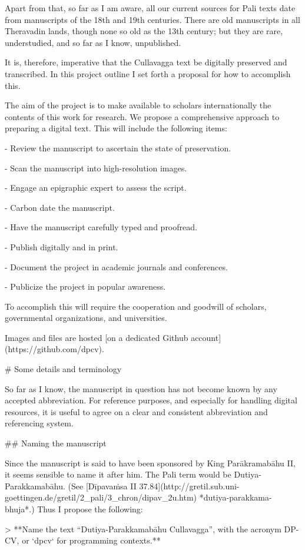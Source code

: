 \documentclass[11pt, openany,a5paper]{article}
\begin{document}
\begin{markdown}
Apart from that, so far as I am aware, all our current sources for Pali texts date from manuscripts of the 18th and 19th centuries. There are old manuscripts in all Theravadin lands, though none so old as the 13th century; but they are rare, understudied, and so far as I know, unpublished.

It is, therefore, imperative that the Cullavagga text be digitally preserved and transcribed. In this project outline I set forth a proposal for how to accomplish this.

The aim of the project is to make available to scholars internationally the contents of this work for research. We propose a comprehensive approach to preparing a digital text. This will include the following items:

- Review the manuscript to ascertain the state of preservation.

- Scan the manuscript into high-resolution images.

- Engage an epigraphic expert to assess the script.

- Carbon date the manuscript.

- Have the manuscript carefully typed and proofread.

- Publish digitally and in print.

- Document the project in academic journals and conferences.

- Publicize the project in popular awareness.

To accomplish this will require the cooperation and goodwill of scholars, governmental organizations, and universities.

Images and files are hosted [on a dedicated Github account](https://github.com/dpcv).

# Some details and terminology

So far as I know, the manuscript in question has not become known by any accepted abbreviation. For reference purposes, and especially for handling digital resources, it is useful to agree on a clear and consistent abbreviation and referencing system.

## Naming the manuscript

Since the manuscript is said to have been sponsored by King Parākramabāhu II, it seems sensible to name it after him. The Pali term would be Dutiya-Parakkamabāhu. (See [Dīpavaṁsa II 37.84](http://gretil.sub.uni-goettingen.de/gretil/2_pali/3_chron/dipav_2u.htm) *dutiya-parakkama-bhuja*.) Thus I propose the following:

> **Name the text “Dutiya-Parakkamabāhu Cullavagga”, with the acronym DP-CV, or `dpcv` for programming contexts.**


\end{markdown}
\end{document}
